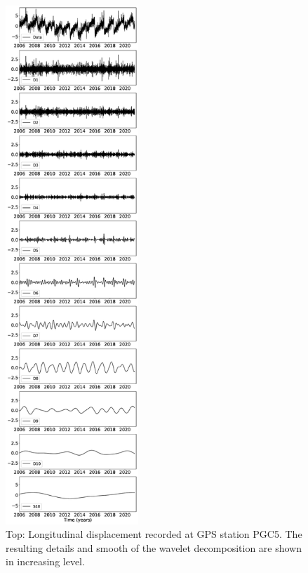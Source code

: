 \documentclass{article}
\begin{document}
\begin{figure}
\noindent\includegraphics[width=5cm, trim={0cm 0cm 0cm 0cm},clip]{figures/cleaned_PGC5_lon.eps}
\caption{Top: Longitudinal displacement recorded at GPS station PGC5. The resulting details and smooth of the wavelet decomposition are shown in increasing level.}
\label{pngfiguresample}
\end{figure}
\end{document}
